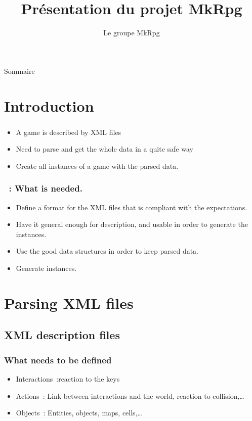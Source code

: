 \documentclass[11pt]{beamer}
\author{Le groupe MkRpg}
\title{Présentation du projet MkRpg}
\begin{document}
\begin{frame}
\titlepage
\end{frame}

\begin{frame}{Sommaire}
\tableofcontents
\end{frame}



\section*{Introduction}

\begin{frame}
    \frametitle{\secname}
    \begin{itemize}
        \item A game is described by XML files
        \item Need to parse and get the whole data in a quite safe way
        \item Create all instances of a game with  the parsed data.
    \end{itemize}
\end{frame}

\begin{frame}
    \frametitle{\secname~: What is needed.}
    \begin{itemize}
        \item Define a format for the XML files that is compliant with the
            expectations.
        \item Have it general enough for description, and usable in order to
            generate the instances.
        \item Use the good data structures in order to keep parsed data.
        \item Generate instances.
    \end{itemize}
\end{frame}

\section{Parsing XML files}
\subsection{XML description files}

\begin{frame}
    \frametitle{What needs to be defined}
    \begin{itemize}
        \item Interactions~:reaction to the keys
        \item Actions~: Link between interactions and the world, reaction to
            collision,\dots
        \item Objects~: Entities, objects, maps, cells,\dots
    \end{itemize}
\end{frame}
\end{document}
